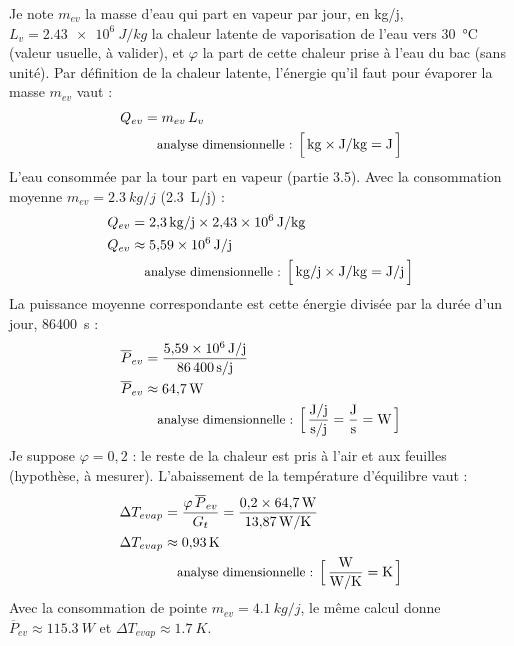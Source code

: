 \begin{demonstration}
Je note $m_{ev}$ la masse d'eau qui part en vapeur par jour, en kg/j, $L_v = \qty{2,43e6}{J/kg}$ la chaleur latente de vaporisation de l'eau vers \qty{30}{\celsius} (valeur usuelle, à valider), et $\varphi$ la part de cette chaleur prise à l'eau du bac (sans unité). Par définition de la chaleur latente, l'énergie qu'il faut pour évaporer la masse $m_{ev}$ vaut :
\begin{align*}
Q_{ev} &= m_{ev}\,L_v\\
\dimline{\unit{kg}\times\unit{J/kg}=\unit{J}}
\end{align*}
L'eau consommée par la tour part en vapeur (partie 3.5). Avec la consommation moyenne $m_{ev} = \qty{2,3}{kg/j}$ (\qty{2,3}{L/j}) :
\begin{align*}
Q_{ev} &= \qty{2,3}{kg/j} \times \qty{2,43e6}{J/kg}\\
Q_{ev} &\approx \qty{5,59e6}{J/j}\\
\dimline{\unit{kg/j}\times\unit{J/kg}=\unit{J/j}}
\end{align*}
La puissance moyenne correspondante est cette énergie divisée par la durée d'un jour, \qty{86400}{s} :
\begin{align*}
\overline{P}_{ev} &= \frac{\qty{5,59e6}{J/j}}{\qty{86400}{s/j}}\\
\overline{P}_{ev} &\approx \qty{64,7}{W}\\
\dimline{\dfrac{\unit{J/j}}{\unit{s/j}}=\dfrac{\unit{J}}{\unit{s}}=\unit{W}}
\end{align*}
Je suppose $\varphi = 0{,}2$ : le reste de la chaleur est pris à l'air et aux feuilles (hypothèse, à mesurer). L'abaissement de la température d'équilibre vaut :
\begin{align*}
\Delta T_{evap} &= \frac{\varphi\,\overline{P}_{ev}}{G_t} = \frac{0{,}2 \times \qty{64,7}{W}}{\qty{13,87}{W/K}}\\
\Delta T_{evap} &\approx \qty{0,93}{K}\\
\dimline{\dfrac{\unit{W}}{\unit{W/K}}=\unit{K}}
\end{align*}
Avec la consommation de pointe $m_{ev} = \qty{4,1}{kg/j}$, le même calcul donne $\overline{P}_{ev} \approx \qty{115,3}{W}$ et $\Delta T_{evap} \approx \qty{1,7}{K}$.
\end{demonstration}

